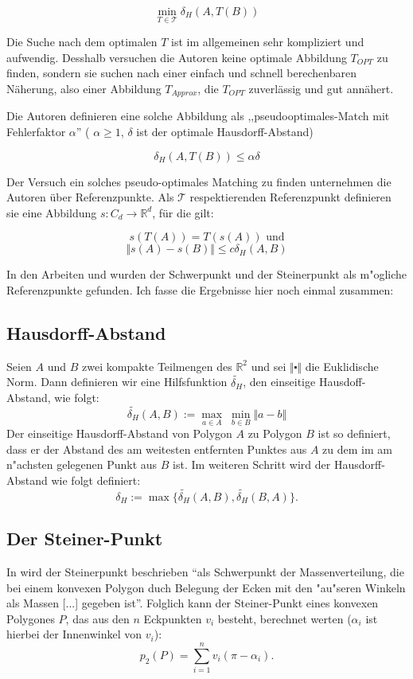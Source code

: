 $$\min_{T\in\mathcal{T}}\delta_H(A,T(B))$$

Die Suche nach dem optimalen $T$ ist im allgemeinen sehr kompliziert und aufwendig. Desshalb versuchen die Autoren keine optimale Abbildung $T_{OPT}$ zu finden, sondern sie suchen nach einer einfach und schnell berechenbaren Näherung, also einer Abbildung $T_{Approx}$, die $T_{OPT}$ zuverlässig und gut annähert.

Die Autoren definieren eine solche Abbildung als ,,pseudooptimales-Match mit Fehlerfaktor $\alpha$'' ( $\alpha\geq 1$, $\delta$ ist der optimale Hausdorff-Abstand)

$$\delta_H(A,T(B))\leq \alpha \delta$$

Der Versuch ein solches pseudo-optimales Matching zu finden unternehmen die Autoren über Referenzpunkte. Als $\mathcal{T}$ respektierenden Referenzpunkt definieren sie eine Abbildung $s:C_d\longrightarrow\mathbb{R}^d$, für die gilt:

$$s(T(A))=T(s(A))\text{ und}$$
$$\Vert s(A)-s(B)\Vert\leq c\delta_H(A,B)$$

In den Arbeiten \cite{AAR} und  \cite{AFRW} wurden der Schwerpunkt und der Steinerpunkt als m"ogliche Referenzpunkte gefunden. Ich fasse die Ergebnisse hier noch einmal zusammen:

\subsection{Hausdorff-Abstand}\label{Hausdorff} 

Seien $A$ und $B$ zwei kompakte Teilmengen des $\mathbb{R}^2$ und sei $\Vert\centerdot\Vert$ die Euklidische Norm.
Dann definieren wir eine Hilfsfunktion $ \widetilde{\delta_H}  $, den einseitige Hausdoff-Abstand, wie folgt:
\[ \widetilde{\delta_H}(A,B):=\max_{a\in A} \;\min_{b\in B} \Vert a-b \Vert\]
Der einseitige Hausdorff-Abstand von Polygon $A$ zu Polygon $B$ ist so definiert, dass er der Abstand des am weitesten entfernten Punktes aus $A$ zu dem im am n"achsten gelegenen Punkt aus $B$ ist.  Im weiteren Schritt wird der Hausdorff-Abstand wie folgt definiert: 
\[\delta_H:=\max\{\widetilde{\delta_H}(A,B),\widetilde{\delta_H}(B,A)\}.\]


\subsection{Der Steiner-Punkt}

In \cite{Sch} wird der Steinerpunkt beschrieben "`als Schwerpunkt der Massenverteilung, die bei einem konvexen Polygon duch Belegung der Ecken mit den "au"seren Winkeln als Massen [...] gegeben ist"'. Folglich kann der Steiner-Punkt eines konvexen Polygones $P$, das aus den $n$ Eckpunkten $v_i$ besteht, berechnet werten ($\alpha_i$ ist hierbei der Innenwinkel von $v_i$):
\[p_2(P)=\sum^n_{i=1}v_i (\pi-\alpha_i).\]

